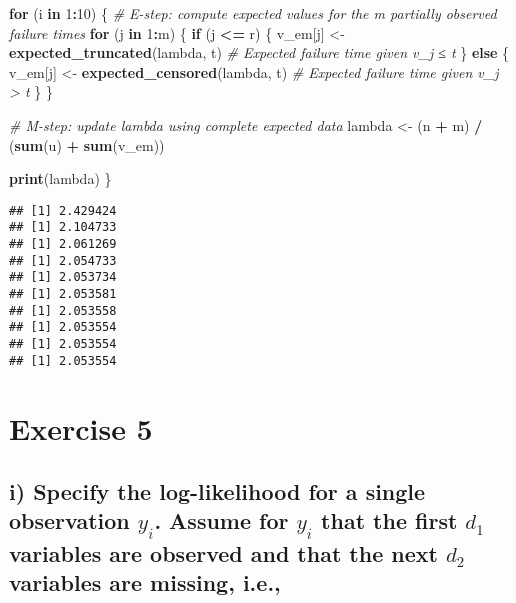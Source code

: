 \documentclass[
]{article}
\newenvironment{Shaded}{\begin{snugshade}}{\end{snugshade}}
\newcommand{\CommentTok}[1]{\textcolor[rgb]{0.56,0.35,0.01}{\textit{#1}}}
\newcommand{\ControlFlowTok}[1]{\textcolor[rgb]{0.13,0.29,0.53}{\textbf{#1}}}
\newcommand{\DecValTok}[1]{\textcolor[rgb]{0.00,0.00,0.81}{#1}}
\newcommand{\FunctionTok}[1]{\textcolor[rgb]{0.13,0.29,0.53}{\textbf{#1}}}
\newcommand{\NormalTok}[1]{#1}
\newcommand{\OtherTok}[1]{\textcolor[rgb]{0.56,0.35,0.01}{#1}}
\newcommand{\SpecialCharTok}[1]{\textcolor[rgb]{0.81,0.36,0.00}{\textbf{#1}}}
\begin{document}
\begin{Shaded}
\begin{Highlighting}[]
\ControlFlowTok{for}\NormalTok{ (i }\ControlFlowTok{in} \DecValTok{1}\SpecialCharTok{:}\DecValTok{10}\NormalTok{) \{}
  \CommentTok{\# E{-}step: compute expected values for the m partially observed failure times}
  \ControlFlowTok{for}\NormalTok{ (j }\ControlFlowTok{in} \DecValTok{1}\SpecialCharTok{:}\NormalTok{m) \{}
    \ControlFlowTok{if}\NormalTok{ (j }\SpecialCharTok{\textless{}=}\NormalTok{ r) \{}
\NormalTok{      v\_em[j] }\OtherTok{\textless{}{-}} \FunctionTok{expected\_truncated}\NormalTok{(lambda, t)  }\CommentTok{\# Expected failure time given v\_j ≤ t}
\NormalTok{    \} }\ControlFlowTok{else}\NormalTok{ \{}
\NormalTok{      v\_em[j] }\OtherTok{\textless{}{-}} \FunctionTok{expected\_censored}\NormalTok{(lambda, t)   }\CommentTok{\# Expected failure time given v\_j \textgreater{} t}
\NormalTok{    \}}
\NormalTok{  \}}

  \CommentTok{\# M{-}step: update lambda using complete expected data}
\NormalTok{  lambda }\OtherTok{\textless{}{-}}\NormalTok{ (n }\SpecialCharTok{+}\NormalTok{ m) }\SpecialCharTok{/}\NormalTok{ (}\FunctionTok{sum}\NormalTok{(u) }\SpecialCharTok{+} \FunctionTok{sum}\NormalTok{(v\_em))}

  \FunctionTok{print}\NormalTok{(lambda)}
\NormalTok{\}}
\end{Highlighting}
\end{Shaded}

\begin{verbatim}
## [1] 2.429424
## [1] 2.104733
## [1] 2.061269
## [1] 2.054733
## [1] 2.053734
## [1] 2.053581
## [1] 2.053558
## [1] 2.053554
## [1] 2.053554
## [1] 2.053554
\end{verbatim}

\section{Exercise 5}\label{exercise-5}

\subsection{\texorpdfstring{i) Specify the log-likelihood for a single
observation \(y_{i}\). Assume for \(y_{i}\) that the first \(d_{1}\)
variables are observed and that the next \(d_{2}\) variables are
missing,
i.e.,}{i) Specify the log-likelihood for a single observation y\_\{i\}. Assume for y\_\{i\} that the first d\_\{1\} variables are observed and that the next d\_\{2\} variables are missing, i.e.,}}\label{i-specify-the-log-likelihood-for-a-single-observation-y_i.-assume-for-y_i-that-the-first-d_1-variables-are-observed-and-that-the-next-d_2-variables-are-missing-i.e.}
\end{document}
